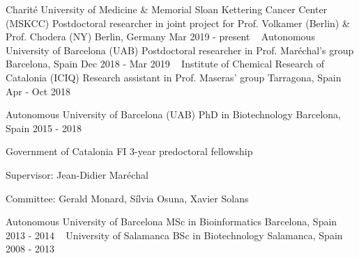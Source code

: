 


\begin{cventries}
  \cventry
    {Charité University of Medicine \& Memorial Sloan Kettering Cancer Center (MSKCC) } %
    {Postdoctoral researcher in joint project for Prof. Volkamer (Berlin) \& Prof. Chodera (NY)}  %
    {Berlin, Germany} %
    {Mar 2019 - present} %
    {~}
  \cventry
    {Autonomous University of Barcelona (UAB)} %
    {Postdoctoral researcher in Prof. Maréchal's group} %
    {Barcelona, Spain} %
    {Dec 2018 - Mar 2019} %
    {~}
  \cventry
    {Institute of Chemical Research of Catalonia (ICIQ)} %
    {Research assistant in Prof. Maseras' group} %
    {Tarragona, Spain} %
    {Apr - Oct 2018} %
    {~}
  \end{cventries}


\begin{cventries}
  \cventry
    {Autonomous University of Barcelona (UAB)} %
    {PhD in Biotechnology} %
    {Barcelona, Spain} %
    {2015 - 2018} %
    {
      \begin{cvitems} %
        \item {Government of Catalonia FI 3-year predoctoral fellowship}
        \item {Supervisor: Jean-Didier Maréchal}
        \item {Committee: Gerald Monard, Sílvia Osuna, Xavier Solans\\}
      \end{cvitems}
    }
  \cventry
    {Autonomous University of Barcelona} %
    {MSc in Bioinformatics} %
    {Barcelona, Spain} %
    {2013 - 2014} %
    {~}
  \cventry
    {University of Salamanca} %
    {BSc in Biotechnology} %
    {Salamanca, Spain} %
    {2008 - 2013} %
    {~}

\end{cventries}
